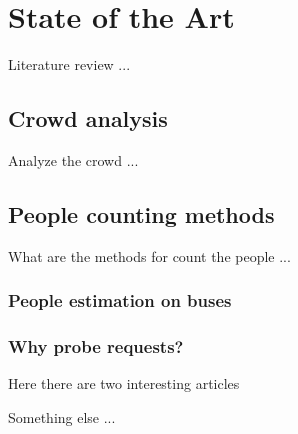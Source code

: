 \chapter{State of the Art}
\label{cha:soa}
\vspace{0.5 cm} 

Literature review ...


\vspace{0.5 cm} 
\section{Crowd analysis}
\label{sec:crowd}
\vspace{0.5 cm} 

Analyze the crowd ...


\vspace{0.5 cm} 
\section{People counting methods}
\label{sec:count}
\vspace{0.5 cm} 

What are the methods for count the people ...


\vspace{0.5 cm} 
\subsection{People estimation on buses}
\label{sec:bus}
\vspace{0.5 cm}


\vspace{0.5 cm} 
\subsection{Why probe requests?}
\label{sec:probe}
\vspace{0.5 cm}

Here there are two interesting articles
\cite{mikkelsen2016public}
\cite{mehmood2019occupancy}


Something else ...
\cite{nishide2019filter}
